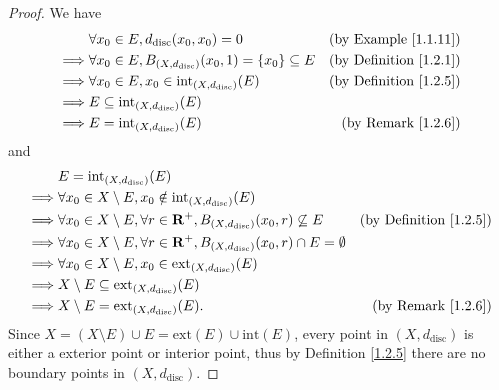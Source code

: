 \begin{proof}
    We have
    \begin{align*}
                 & \forall x_0 \in E, d_{\text{disc}}(x_0, x_0) = 0                          & \text{(by Example \ref{1.1.11})}   \\
        \implies & \forall x_0 \in E, B_{(X, d_{\text{disc}})}(x_0, 1) = \{x_0\} \subseteq E & \text{(by Definition \ref{1.2.1})} \\
        \implies & \forall x_0 \in E, x_0 \in \text{int}_{(X, d_{\text{disc}})}(E)           & \text{(by Definition \ref{1.2.5})} \\
        \implies & E \subseteq \text{int}_{(X, d_{\text{disc}})}(E)                                                               \\
        \implies & E = \text{int}_{(X, d_{\text{disc}})}(E)                                  & \text{(by Remark \ref{1.2.6})}
    \end{align*}
    and
    \begin{align*}
                 & E = \text{int}_{(X, d_{\text{disc}})}(E)                                                                                                    \\
        \implies & \forall x_0 \in X \setminus E, x_0 \notin \text{int}_{(X, d_{\text{disc}})}(E)                                                              \\
        \implies & \forall x_0 \in X \setminus E, \forall r \in \mathbf{R}^+, B_{(X, d_{\text{disc}})}(x_0, r) \not\subseteq E    & \text{(by Definition \ref{1.2.5})} \\
        \implies & \forall x_0 \in X \setminus E, \forall r \in \mathbf{R}^+, B_{(X, d_{\text{disc}})}(x_0, r) \cap E = \emptyset                                      \\
        \implies & \forall x_0 \in X \setminus E, x_0 \in \text{ext}_{(X, d_{\text{disc}})}(E)                                                                 \\
        \implies & X \setminus E \subseteq \text{ext}_{(X, d_{\text{disc}})}(E)                                                                                \\
        \implies & X \setminus E = \text{ext}_{(X, d_{\text{disc}})}(E).                                                  & \text{(by Remark \ref{1.2.6})}
    \end{align*}
    Since \(X = (X \setminus E) \cup E = \text{ext}(E) \cup \text{int}(E)\), every point in \((X, d_{\text{disc}})\) is either a exterior point or interior point, thus by Definition \ref{1.2.5} there are no boundary points in \((X, d_{\text{disc}})\).
\end{proof}

